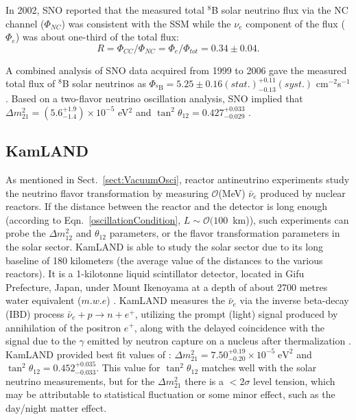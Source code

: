 In 2002, SNO reported that the measured total $^8$B solar neutrino flux via the NC channel ($\Phi_{NC}$) was consistent with the SSM while the $\nu_e$
component of the flux ($\Phi_e$) was about one-third of the total flux\cite{ahmad2002direct}:
\begin{equation}
R = \Phi_{CC}/\Phi_{NC} = \Phi_e/\Phi_{tot}=0.34\pm 0.04.
\end{equation}

A combined analysis of SNO data acquired from 1999 to 2006 gave the measured total flux of $^8$B solar neutrinos as $\Phi_{^8\mathrm{B}}=5.25\pm0.16(stat.)^{+0.11}_{-0.13}(syst.)$ cm$^{-2}$s$^{-1}$. Based on a two-flavor neutrino oscillation analysis, SNO implied that $\Delta m^2_{21}=(5.6^{+1.9}_{-1.4})\times 10^{-5}$ eV$^2$ and $\tan^2\theta_{12}=0.427^{+0.033}_{-0.029}$ \cite{aharmim2013combined}.

\subsection{KamLAND}

As mentioned in Sect.~\ref{sect:VacuumOsci}, reactor antineutrino experiments study the neutrino flavor transformation by measuring $\mathcal{O}$(MeV) $\bar{\nu}_e$ produced by nuclear reactors. If the distance between the reactor and the detector is long enough (according to Eqn.~\ref{oscillationCondition}, $L\sim\mathcal{O}(100$~km)), such experiments can probe the $\Delta m^2_{12}$ and $\theta_{12}$ parameters, or the flavor transformation parameters in the solar sector. KamLAND is able to study the solar sector due to its long baseline of 180 kilometers (the average value of the distances to the various reactors). It is a 1-kilotonne liquid scintillator detector, located in Gifu Prefecture, Japan, under Mount Ikenoyama at a depth of about 2700 metres water equivalent ($m.w.e$) \cite{abe2008precision}. KamLAND measures the $\bar{\nu}_e$ via the inverse beta-decay (IBD) process $\bar{\nu}_e + p \rightarrow n + e^+$, utilizing the prompt (light) signal produced by annihilation of the positron $e^+$, along with the delayed
coincidence with the signal due to the $\gamma$ emitted by neutron capture on a nucleus after thermalization \cite{pdg2020}. KamLAND provided  best fit values of \cite{gando2011constraints}: $\Delta m_{21}^2=7.50^{+0.19}_{-0.20}\times10^{-5} \; \mathrm{eV^2}$ and $\tan^2\theta_{12}=0.452^{+0.035}_{-0.033}$. This value for $\tan^2\theta_{12}$ matches well with the solar neutrino measurements, but for the $\Delta m^2_{21}$ there is a $<2\sigma$ level tension, which may be attributable to statistical fluctuation or some minor effect, such as the day/night matter effect.


